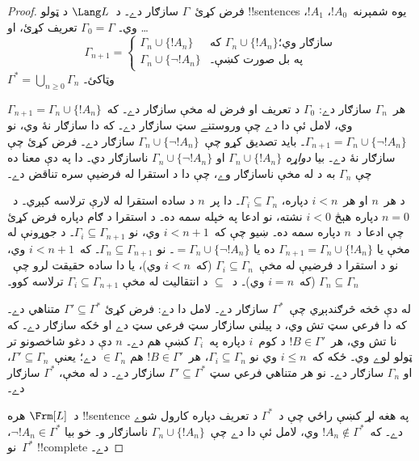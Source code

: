 \documentclass[../../../include/open-logic-section]{subfiles}
\begin{document}
\begin{proof}
فرض کړئ~$\Gamma$ سازګار دے۔ د~$\Lang L$ د ټولو !!{sentence}s يوه
شمېرنه~$!A_0$، $!A_1$، \dots{} وي۔ $\Gamma_0 = \Gamma$ تعريف
کړئ، او
\[
\Gamma_{n+1} =
\begin{cases}
\Gamma_n \cup \{ !A_n \} & \textrm{که $\Gamma_n \cup \{!A_n\}$
  سازګار وي؛} \\
\Gamma_n \cup \{ \lnot !A_n \} & \textrm{په بل صورت کښې۔}
\end{cases}
\]
$\Gamma^* = \bigcup_{n \geq 0} \Gamma_n$ وټاکئ۔

هر~$\Gamma_n$ سازګار دے: $\Gamma_0$ د تعريف او فرض له مخې سازګار
دے۔ که~$\Gamma_{n+1} = \Gamma_n \cup \{!A_n\}$ وي، لامل ئې دا
دے چې وروستنے سټ سازګار دے۔ که دا سازګار نۀ وي، نو
$\Gamma_{n+1} = \Gamma_n \cup \{\lnot !A_n\}$۔ بايد تصديق کړو
چې~$\Gamma_n \cup \{\lnot !A_n\}$ سازګار دے۔ فرض کړئ چې سازګار
نۀ دے۔ بيا \emph{دواړه} $\Gamma_n \cup \{!A_n\}$ او
$\Gamma_n \cup \{\lnot !A_n\}$ ناسازګار دي۔ دا په دې معنا ده چې
$\Gamma_n$ به د
له مخې ناسازګار وے، چې دا د استقرا له فرضيې سره تناقض دے۔

د هر~$n$ او هر~$i < n$ دپاره، $\Gamma_i \subseteq \Gamma_n$۔
دا پر~$n$ د ساده استقرا له لارې ترلاسه کېږي۔ د~$n=0$ دپاره هېڅ
$i < 0$ نشته، نو ادعا په خپله سمه ده۔ د استقرا د ګام دپاره فرض
کړئ چې ادعا د~$n$ دپاره سمه ده۔ ښيو چې که~$i < n+1$ وي، نو
$\Gamma_i \subseteq \Gamma_{n+1}$۔ د جوړونې له مخې يا
$\Gamma_{n+1} = \Gamma_n \cup \{!A_n\}$ ده يا
$= \Gamma_n \cup \{\lnot !A_n\}$۔ نو
$\Gamma_n \subseteq \Gamma_{n+1}$۔ که~$i < n+1$ وي، نو د
استقرا د فرضيې له مخې~$\Gamma_i \subseteq \Gamma_n$ (که~$i < n$
وي)، يا دا ساده حقيقت لرو چې~$\Gamma_n \subseteq \Gamma_n$
(که~$i = n$ وي)۔ د~$\subseteq$ د انتقاليت له مخې
$\Gamma_i \subseteq \Gamma_{n+1}$ ترلاسه کوو۔

له دې څخه څرګندېږي چې~$\Gamma^*$ سازګار دے۔ لامل دا دے: فرض کړئ
$\Gamma' \subseteq \Gamma^*$ متناهي دے۔
که دا فرعي سټ تش وي، د پيلني سازګار سټ فرعي سټ دے او ځکه سازګار دے۔
که نا تش وي، هر~$!B \in \Gamma'$ د
کوم~$i$ دپاره په~$\Gamma_i$ کښې هم دے۔ $n$ دې د دغو شاخصونو تر
ټولو لوے وي۔ ځکه که~$i \le n$ وي نو
$\Gamma_i \subseteq \Gamma_n$، هر~$!B \in \Gamma'$ هم
$\in \Gamma_n$ دے؛ يعنې~$\Gamma' \subseteq \Gamma_n$، او
$\Gamma_n$ سازګار دے۔ نو هر متناهي فرعي سټ
$\Gamma' \subseteq \Gamma^*$ سازګار دے۔ د
 له مخې، $\Gamma^*$
سازګار دے۔

د~$\Frm[L]$ هره !!{sentence} په هغه لړ کښې راځي چې د~$\Gamma^*$
د تعريف دپاره کارول شوے دے۔ که~$!A_n \notin \Gamma^*$ وي، لامل
ئې دا دے چې~$\Gamma_n \cup \{!A_n\}$ ناسازګار و۔ خو بيا
$\lnot !A_n \in \Gamma^*$، نو~$\Gamma^*$ !!{complete} دے۔
\end{proof}
\end{document}
